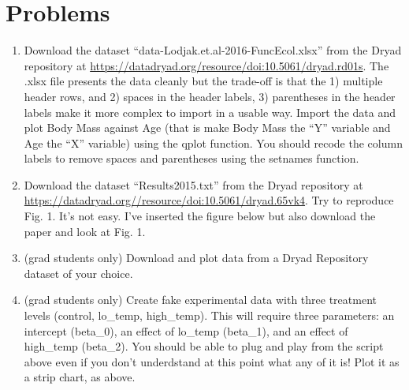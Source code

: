 \documentclass[]{book}
\begin{document}
\section{Problems}\label{problems}

\begin{enumerate}
\def\labelenumi{\arabic{enumi}.}
\item
  Download the dataset ``data-Lodjak.et.al-2016-FuncEcol.xlsx'' from the
  Dryad repository at
  \url{https://datadryad.org/resource/doi:10.5061/dryad.rd01s}. The
  .xlsx file presents the data cleanly but the trade-off is that the 1)
  multiple header rows, and 2) spaces in the header labels, 3)
  parentheses in the header labels make it more complex to import in a
  usable way. Import the data and plot Body Mass against Age (that is
  make Body Mass the ``Y'' variable and Age the ``X'' variable) using
  the qplot function. You should recode the column labels to remove
  spaces and parentheses using the setnames function.
\item
  Download the dataset ``Results2015.txt'' from the Dryad repository at
  \url{https://datadryad.org//resource/doi:10.5061/dryad.65vk4}. Try to
  reproduce Fig. 1. It's not easy. I've inserted the figure below but
  also download the paper and look at Fig. 1.
\item
  (grad students only) Download and plot data from a Dryad Repository
  dataset of your choice.
\item
  (grad students only) Create fake experimental data with three
  treatment levels (control, lo\_temp, high\_temp). This will require
  three parameters: an intercept (beta\_0), an effect of lo\_temp
  (beta\_1), and an effect of high\_temp (beta\_2). You should be able
  to plug and play from the script above even if you don't underdstand
  at this point what any of it is! Plot it as a strip chart, as above.
\end{enumerate}
\end{document}

